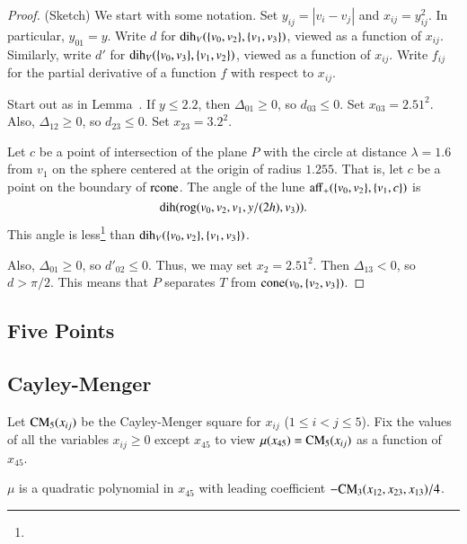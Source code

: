 \begin{tarskidata}
\begin{tarski}
\begin{proof} (Sketch)  We start with some notation.
Set $y_{ij}=|v_i-v_j|$ and $x_{ij} =y_{ij}^2$.  In particular, $y_{01}=y$.
Write $d$ for $\operatorname{dih}_V(\{v_0,v_2\},\{v_1,v_3\})$, viewed as a function
of $x_{ij}$.
Similarly, write $d'$ for $\operatorname{dih}_V(\{v_0,v_3\},\{v_1,v_2\})$, 
viewed as a function
of $x_{ij}$.
Write $f_{ij}$ for the
partial derivative of a function $f$ with respect to $x_{ij}$. 

Start out as in Lemma~.
If $y\le 2.2$, then $\Delta_{01}\ge0$, so
    $d_{03}\le 0$.
Set $x_{03}=2.51^2$. Also, $\Delta_{12}\ge0$, so
    $d_{23}\le0$.
Set $x_{23}=3.2^2$.

Let $c$ be a point of intersection of the plane $P$ with
the circle at distance $\lambda=1.6$ from $v_1$ on the sphere centered
at the origin of radius $1.255$.  That is, let $c$ be a point on the boundary
of ${\operatorname{rcone}}$.  The angle of the lune ${\operatorname{aff}}_+(\{v_0,v_2\},\{v_1,c\})$
is 
    $$\operatorname{dih}({\operatorname{rog}}(v_0,v_2,v_1,y/(2 h),v_3)).$$
This angle is less\footnote{} %
than $\operatorname{dih}_V(\{v_0,v_2\},\{v_1,v_3\})$. 

Also, $\Delta_{01}\ge0$, so $d'_{02}\le 0$.  Thus, we may
set $x_2=2.51^2$. Then
$\Delta_{13}<0$, so $d >\pi/2$.  This means that $P$
separates $T$ from ${\operatorname{cone}}(v_0,\{v_2,v_3\})$. 
\end{proof}
\end{tarski}





\begin{tarski}
\section{Five Points}
\subsection{Cayley-Menger}
Let ${\operatorname{CM}}_5(x_{ij})$ be the Cayley-Menger
square for $x_{ij}$  ($1\le i < j\le 5$).  Fix the values of all the variables $x_{ij}\ge 0$ except
$x_{45}$ to view $\mu(x_{45})={\operatorname{CM}}_5(x_{ij})$ as a function of $x_{45}$.

\begin{lemma}
$\mu$  is a quadratic
polynomial in $x_{45}$ with leading coefficient 
$-{\operatorname{CM}}_3(x_{12},x_{23},x_{13})/4$. 
\end{lemma}


\end{tarski}
\end{tarskidata}
